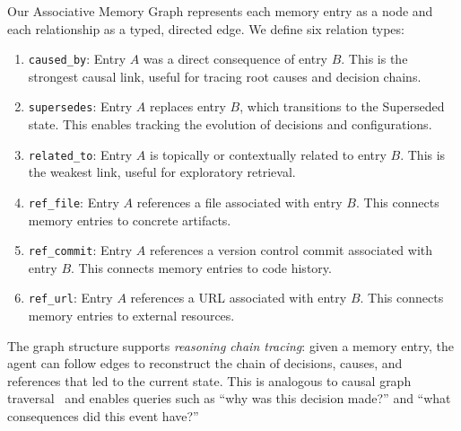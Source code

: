 \documentclass[11pt]{article}
\begin{document}
Our Associative Memory Graph represents each memory entry as a node and each relationship as a typed, directed edge. We define six relation types:

\begin{enumerate}
    \item \texttt{caused\_by}: Entry $A$ was a direct consequence of entry $B$. This is the strongest causal link, useful for tracing root causes and decision chains.
    \item \texttt{supersedes}: Entry $A$ replaces entry $B$, which transitions to the Superseded state. This enables tracking the evolution of decisions and configurations.
    \item \texttt{related\_to}: Entry $A$ is topically or contextually related to entry $B$. This is the weakest link, useful for exploratory retrieval.
    \item \texttt{ref\_file}: Entry $A$ references a file associated with entry $B$. This connects memory entries to concrete artifacts.
    \item \texttt{ref\_commit}: Entry $A$ references a version control commit associated with entry $B$. This connects memory entries to code history.
    \item \texttt{ref\_url}: Entry $A$ references a URL associated with entry $B$. This connects memory entries to external resources.
\end{enumerate}

The graph structure supports \emph{reasoning chain tracing}: given a memory entry, the agent can follow edges to reconstruct the chain of decisions, causes, and references that led to the current state. This is analogous to causal graph traversal~\cite{pearl2009} and enables queries such as ``why was this decision made?'' and ``what consequences did this event have?''
\end{document}
